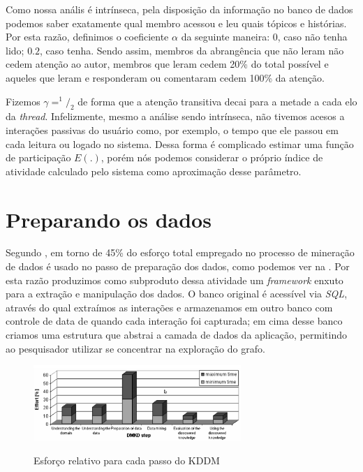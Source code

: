 Como nossa anális é intrínseca, pela disposição da informação no banco de dados
podemos saber exatamente qual membro acessou e leu quais tópicos e histórias.
Por esta razão, definimos o coeficiente $\alpha$ da seguinte maneira: 0, caso
não tenha lido; $0.2$, caso tenha. Sendo assim, membros da abrangência que não
leram não cedem atenção ao autor, membros que leram cedem 20\% do total possível
e aqueles que leram e responderam ou comentaram cedem 100\% da atenção.

Fizemos $\gamma=^1/_2$ de forma que a atenção transitiva decai para a metade a
cada elo da \textit{thread}. Infelizmente, mesmo a análise sendo intrínseca, não
tivemos acesos a interações passivas do usuário como, por exemplo, o tempo que
ele passou em cada leitura ou logado no sistema. Dessa forma é complicado
estimar uma função de participação $E(.)$, porém nós podemos considerar o
próprio índice de atividade calculado pelo sistema como aproximação desse
parâmetro.

\section{Preparando os dados}
\label{ap:sec:preparacao}

Segundo \citet{Cios2005}, em torno de 45\% do esforço total empregado no
processo de mineração de dados é usado no passo de preparação dos dados, como
podemos ver na . Por esta razão produzimos como
subproduto dessa atividade um \emph{framework} enxuto para a extração e
manipulação dos dados. O banco original é acessível via \emph{SQL}, através do
qual extraímos as interações e armazenamos em outro banco com controle de data
de quando cada interação foi capturada; em cima desse banco criamos uma
estrutura que abstrai a camada de dados da aplicação, permitindo ao pesquisador
utilizar se concentrar na exploração do grafo.

\begin{figure}[h!]
  \caption{Esforço relativo para cada passo do KDDM \citep{Cios2005}}
  \centering
    \includegraphics[width=0.7\textwidth]{imgs/preparation-time.png}
    \label{ap:fig:esforco}
\end{figure}

